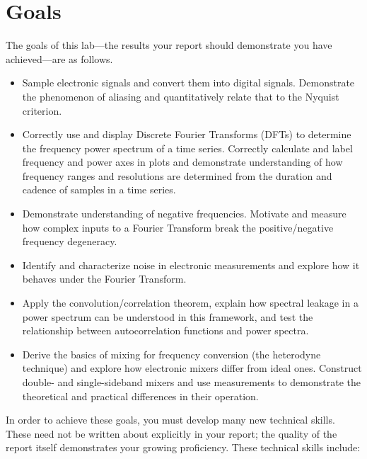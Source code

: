 \documentclass[11pt,preprint]{aastex}
\begin{document}
\section{Goals} \label{goals}

\noindent
The goals of this lab---the results your report should
demonstrate you have achieved---are as follows.

\begin{itemize}

\item Sample electronic signals and convert them into digital signals. Demonstrate
the phenomenon of aliasing and quantitatively relate that to the Nyquist criterion.

\item Correctly use and display Discrete Fourier Transforms (DFTs) to 
  determine the frequency power spectrum of a time
  series. Correctly calculate and label frequency and power axes in plots and demonstrate
  understanding of how frequency ranges and resolutions are determined from the duration and 
  cadence of samples in a time series.

\item Demonstrate understanding of negative frequencies. Motivate and measure how complex inputs to a Fourier Transform
break the positive/negative frequency degeneracy.


\item Identify and characterize noise in electronic measurements and explore how it behaves 
  under the Fourier Transform.

\item Apply the convolution/correlation theorem, explain how
  spectral leakage in a power spectrum can be understood in this framework,
  and test the relationship between autocorrelation functions and power spectra.

\item Derive the basics of mixing for frequency conversion
  (the heterodyne technique) and explore how electronic mixers differ from
  ideal ones. Construct double- and single-sideband mixers and use measurements
  to demonstrate the theoretical and practical differences in their operation.

\end{itemize}

\noindent
In order to achieve these goals, you must develop many new technical skills.
These need not be written about explicitly in your report; the quality of
the report itself demonstrates your growing proficiency. These technical skills include:
\end{document}

